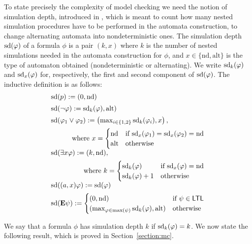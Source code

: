 To state precisely the complexity of model checking \SLref we need the
 notion of simulation depth, introduced in ,
 which is meant to count how many nested simulation procedures have to
 be performed in the automata construction, to change alternating
 automata into nondeterministic ones. The simulation depth
 $\mbox{sd}(\varphi)$ of a formula $\phi$ is a pair $(k,x)$ where $k$ is the
 number of nested simulations needed in the automata construction for
 $\phi$, and $x\in\{\text{nd},\text{alt}\}$ is the type of automaton
 obtained (nondeterministic or alternating). We write $\mbox{sd}_k(\varphi)$
 and $\mbox{sd}_x(\varphi)$ for, respectively, the first and second component of $\mbox{sd}(\varphi)$.
 The inductive definition is as follows:
      \[
        \begin{array}{l}%
          \ndd(p) \egdef (0,\nd)\\[5pt]
          \ndd(\neg \phi) \egdef \ndd_k(\phi),\alt)\\[5pt]
          \ndd(\phi_1\ou\phi_2) \egdef \left
          (\max_{i\in\{1,2\}}\ndd_k(\phi_i), x \right ),\\[5pt]
          \hfill \mbox{where
          }x=    \begin{cases}
            \nd & \mbox{if }\ndd_x(\phi_1)=\ndd_x(\phi_2)=\nd\\
            \alt & \mbox{otherwise}
          \end{cases}
          \\[5pt]
          \ndd( \exists\var\phi)\egdef (k,\nd),\\[5pt]
          \hfill \mbox{where }
          k=\begin{cases}
            \ndd_k(\phi) & \mbox{if }\ndd_x(\phi)=\nd \\
            \ndd_k(\phi)+1 & \mbox{otherwise}
          \end{cases} \\[5pt]
          \ndd(\bind{\var}\phi) \egdef \ndd(\phi)\\[5pt]
          \ndd(\Eout\psi)\egdef
          \begin{cases}
            (0,\nd) &\mbox{if }\psi\in\LTL\\
            (\max_{\phi\in\max(\psi)}\ndd_k(\phi),\alt) &\mbox{otherwise}
          \end{cases}                                                        
        \end{array}
      \]

We say that a formula $\phi$ has simulation depth $k$ if
$\mbox{sd}_k(\varphi)=k$.  We now state the following result, which is proved
in Section~\ref{section:mc}.

